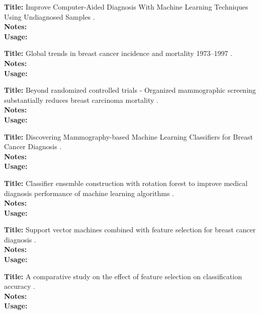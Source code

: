 \documentclass[a4paper]{article}
\begin{document}
\noindent
\textbf{Title:} Improve Computer-Aided Diagnosis With Machine Learning Techniques Using Undiagnosed Samples \cite{li2007}.
\\
\textbf{Notes:}
\\
\textbf{Usage:}
\\\par

\noindent
\textbf{Title:} Global trends in breast cancer incidence and mortality 1973–1997 \cite{althuis2005}.
\\
\textbf{Notes:}
\\
\textbf{Usage:}
\\\par

\noindent
\textbf{Title:} Beyond randomized controlled trials - Organized mammographic screening substantially reduces breast carcinoma mortality \cite{tabar2001}.
\\
\textbf{Notes:}
\\
\textbf{Usage:}
\\\par

\noindent
\textbf{Title:} Discovering Mammography-based Machine Learning Classifiers for Breast Cancer Diagnosis \cite{ramos2012}.
\\
\textbf{Notes:}
\\
\textbf{Usage:}
\\\par

\noindent
\textbf{Title:} Classifier ensemble construction with rotation forest to improve medical diagnosis performance of machine learning algorithms \cite{akin2011}.
\\
\textbf{Notes:}
\\
\textbf{Usage:}
\\\par

\noindent
\textbf{Title:} Support vector machines combined with feature selection for breast cancer diagnosis \cite{akay2009}.
\\
\textbf{Notes:}
\\
\textbf{Usage:}
\\\par

\noindent
\textbf{Title:} A comparative study on the effect of feature selection on classification accuracy \cite{karabulut2012}.
\\
\textbf{Notes:}
\\
\textbf{Usage:}
\\\par
\end{document}
